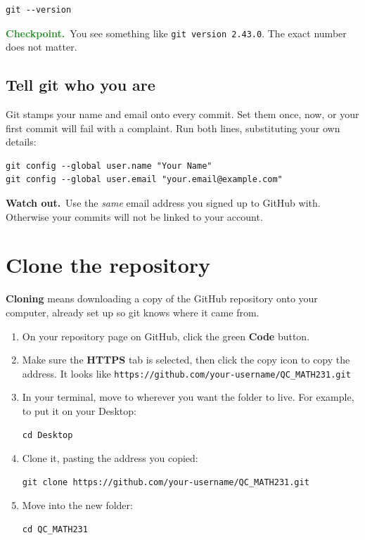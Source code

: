 \documentclass[11pt]{article}
\newcommand{\checkpoint}[1]{\par\smallskip\noindent
  {\small\sffamily\textcolor{ForestGreen}{\textbf{Checkpoint.}}\ #1}\par\smallskip}
\newcommand{\heads}[1]{\par\smallskip\noindent
  {\small\sffamily\textcolor{BrickRed}{\textbf{Watch out.}}\ #1}\par\smallskip}
\newcommand{\repname}{QC\_MATH231}
\begin{document}
\begin{lstlisting}
git --version
\end{lstlisting}

\checkpoint{You see something like \texttt{git version 2.43.0}. The exact
number does not matter.}

\subsection*{Tell git who you are}
Git stamps your name and email onto every commit. Set them once, now, or your
first commit will fail with a complaint. Run both lines, substituting your own
details:

\begin{lstlisting}
git config --global user.name "Your Name"
git config --global user.email "your.email@example.com"
\end{lstlisting}

\heads{Use the \emph{same} email address you signed up to GitHub with.
Otherwise your commits will not be linked to your account.}

\section{Clone the repository}
\textbf{Cloning} means downloading a copy of the GitHub repository onto your
computer, already set up so git knows where it came from.

\begin{enumerate}[leftmargin=2.0em,itemsep=5pt]
  \item On your repository page on GitHub, click the green \textbf{Code} button.
  \item Make sure the \textbf{HTTPS} tab is selected, then click the copy icon
        to copy the address. It looks like
        \texttt{https://github.com/your-username/\repname.git}
  \item In your terminal, move to wherever you want the folder to live. For
        example, to put it on your Desktop:
\begin{lstlisting}
cd Desktop
\end{lstlisting}
  \item Clone it, pasting the address you copied:
\begin{lstlisting}
git clone https://github.com/your-username/QC_MATH231.git
\end{lstlisting}
  \item Move into the new folder:
\begin{lstlisting}
cd QC_MATH231
\end{lstlisting}
\end{enumerate}
\end{document}
